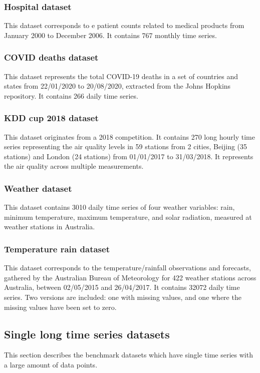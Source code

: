 \subsubsection{Hospital dataset}
This dataset corresponds to e patient counts related to medical products from January 2000 to December 2006. It contains 767 monthly time series.

\subsubsection{COVID deaths dataset}
This dataset represents the total COVID-19 deaths in a set of countries and states from 22/01/2020 to 20/08/2020, extracted from the Johns Hopkins repository. It contains 266 daily time series.

\subsubsection{KDD cup 2018 dataset}
This dataset originates from a 2018 competition. It contains 270 long hourly time series representing  the air quality levels in 59 stations from 2 cities, Beijing (35 stations) and London (24 stations) from 01/01/2017 to 31/03/2018. It represents the air quality across multiple measurements.

\subsubsection{Weather dataset}
This dataset contains 3010 daily time series of four weather variables: rain, minimum temperature,
maximum temperature, and solar radiation, measured at weather stations in Australia.

\subsubsection{Temperature rain dataset}
This dataset corresponds to the temperature/rainfall observations and forecasts, gathered by the Australian Bureau of Meteorology for 422 weather stations across Australia, between 02/05/2015 and 26/04/2017. It contains 32072 daily time series. Two versions are included: one with missing values, and one where the missing values have been set to zero.

\subsection{Single long time series datasets}
This section describes the benchmark datasets which have single time series with a large amount of
data points.

